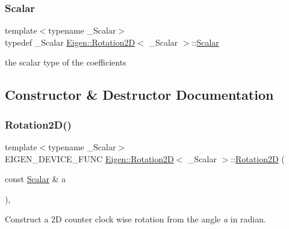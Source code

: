 \subsubsection{\texorpdfstring{Scalar}{Scalar}}
{\footnotesize\ttfamily template$<$typename \+\_\+\+Scalar$>$ \\
typedef \+\_\+\+Scalar \mbox{\hyperlink{class_eigen_1_1_rotation2_d}{Eigen\+::\+Rotation2D}}$<$ \+\_\+\+Scalar $>$\+::\mbox{\hyperlink{class_eigen_1_1_rotation2_d_ac20c665ece0f197a712a2a39ae72e4e4}{Scalar}}}

the scalar type of the coefficients 

\subsection{Constructor \& Destructor Documentation}
\mbox{\label{class_eigen_1_1_rotation2_d_a581ea9ac3741f81c9c9416ed77246cc2}} 
\subsubsection{\texorpdfstring{Rotation2D()}{Rotation2D()}\hspace{0.1cm}{\footnotesize\ttfamily [1/4]}}
{\footnotesize\ttfamily template$<$typename \+\_\+\+Scalar$>$ \\
E\+I\+G\+E\+N\+\_\+\+D\+E\+V\+I\+C\+E\+\_\+\+F\+U\+NC \mbox{\hyperlink{class_eigen_1_1_rotation2_d}{Eigen\+::\+Rotation2D}}$<$ \+\_\+\+Scalar $>$\+::\mbox{\hyperlink{class_eigen_1_1_rotation2_d}{Rotation2D}} (\begin{DoxyParamCaption}\item[{const \mbox{\hyperlink{class_eigen_1_1_rotation2_d_ac20c665ece0f197a712a2a39ae72e4e4}{Scalar}} \&}]{a }\end{DoxyParamCaption})\hspace{0.3cm}{\ttfamily [inline]}, {\ttfamily [explicit]}}

Construct a 2D counter clock wise rotation from the angle {\itshape a} in radian. \mbox{\label{class_eigen_1_1_rotation2_d_adcd50e17d84f71f584335e8ff3f2d994}} 
